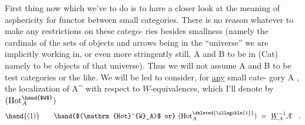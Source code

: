 First thing now which we've to do is to have a closer look at the
meaning of asphericity for  functor between  small categories.  There is
no reason whatever to  make any restrictions on these catego-%
ries besides smallness  (namely the cardinals of the sets of objects and
arrows being in the ``universe'' we are implicitly working in,  or even
more stringently still,  A and B to be in (Cat)  namely to be objects
of that universe).  Thus we will not assume A and B to be test categories
or the like.   We will be led to consider,  for \uline{any} small cate-%
gory A ,  the localization of A\^{} with respect to $\underline{W}$-equivalences,  which
I'll denote by $(\mathrm{Hot}^{\hand{$W$}}_A)$ 
\[ \hand{(1)} \qquad \hand{$(\mathrm{Hot}^{W}_A)$ or} \ (\mathrm{Hot}^{\deleted{\illegible{1}}}_A) \ = \ \underline{W}_A^{-1}A\hat{} \quad . \]

